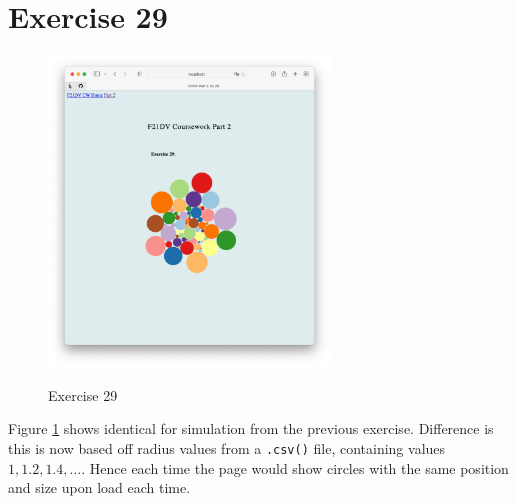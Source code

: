 \documentclass{scrreprt}
\begin{document}
\newpage
\section{Exercise 29}
\begin{figure}[!ht]
    \centering
    \includegraphics[width = 7.5cm]{images/ex29.png}
    \label{fig:ex29}
    \caption{Exercise 29}
\end{figure}
\FloatBarrier
% 
Figure \ref{fig:ex29} shows identical for simulation from the previous exercise. Difference is this is now based off radius values from a \verb|.csv()| file, containing values $1, 1.2, 1.4, ...$. Hence each time the page would show circles with the same position and size upon load each time.

\newpage
\end{document}
